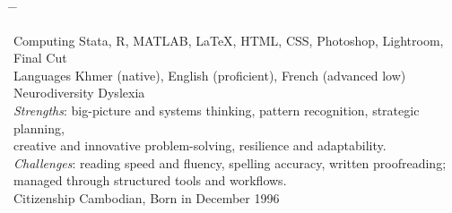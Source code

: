 \documentclass[10pt,a4paper]{article}
\newcommand{\tabbedblockwide}[1]{
	
	\begin{tabbing}
		\hspace{2.5cm} \= \hspace{4cm} \= \kill
		#1
	\end{tabbing}
}
\begin{document}
\tabbedblockwide{
	Computing \> Stata, R, MATLAB, \LaTeX, HTML, CSS, Photoshop, Lightroom, Final Cut\\
	
	Languages \> Khmer (native), English (proficient), French (advanced low)\\
	
Neurodiversity \hspace{0.4cm} \> Dyslexia \\
		\> \textit{Strengths}: big-picture and systems thinking, pattern recognition, strategic planning, \\
		\> creative and innovative problem-solving, resilience and adaptability. \\
		\> \textit{Challenges}: reading speed and fluency, spelling accuracy, written proofreading; \\
		\> managed through structured tools and workflows. \\

	
	Citizenship \> Cambodian, Born in December 1996
}





\end{document}
